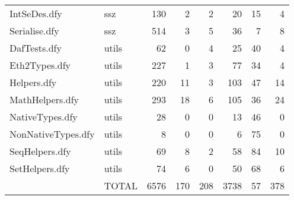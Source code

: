 \documentclass[a4paper, 12pt]{article}
\begin{document}
\begin{tabular}{llrrrrrr}
                IntSeDes.dfy &                           ssz &   130 &         2 &                2 &             20 &             15 &       4 \\
               Serialise.dfy &                           ssz &   514 &         3 &                5 &             36 &              7 &       8 \\
                DafTests.dfy &                         utils &    62 &         0 &                4 &             25 &             40 &       4 \\
               Eth2Types.dfy &                         utils &   227 &         1 &                3 &             77 &             34 &       4 \\
                 Helpers.dfy &                         utils &   220 &        11 &                3 &            103 &             47 &      14 \\
             MathHelpers.dfy &                         utils &   293 &        18 &                6 &            105 &             36 &      24 \\
             NativeTypes.dfy &                         utils &    28 &         0 &                0 &             13 &             46 &       0 \\
          NonNativeTypes.dfy &                         utils &     8 &         0 &                0 &              6 &             75 &       0 \\
              SeqHelpers.dfy &                         utils &    69 &         8 &                2 &             58 &             84 &      10 \\
              SetHelpers.dfy &                         utils &    74 &         6 &                0 &             50 &             68 &       6 \\
                             &                         TOTAL &  6576 &       170 &              208 &           3738 &             57 &     378 \\
\bottomrule
\end{tabular}
\end{document}
